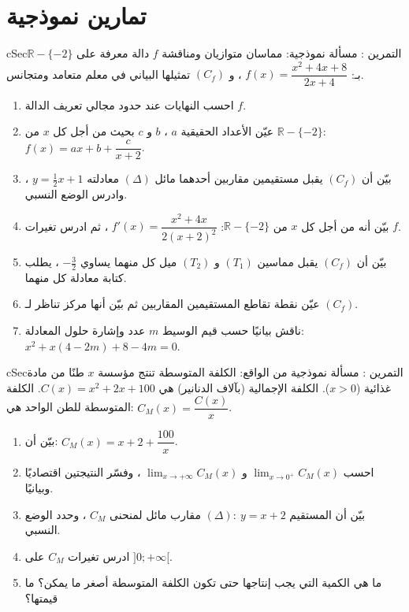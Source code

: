 \documentclass[12pt,a4paper]{article}
\newenvironment{BOX}[2]{\begin{otherlanguage}{english}\begin{arbox}{#1}{#2}}{\end{arbox}\end{otherlanguage}}
\newcounter{exo}
\newenvironment{tamrin}[1]{\stepcounter{exo}\begin{BOX}{cSec}{التمرين \theexo: #1}}{\end{BOX}}
\newcommand{\R}{\mathbb{R}}
\newcommand{\Lm}[1]{\displaystyle\lim_{x\to#1}}
\begin{document}
\section{تمارين نموذجية}
\begin{tamrin}{مسألة نموذجية: مماسان متوازيان ومناقشة}
$f$ دالة معرفة على $\R-\{-2\}$ بـ: $f(x)=\dfrac{x^2+4x+8}{2x+4}$ ، و $(C_f)$ تمثيلها البياني في معلم متعامد ومتجانس.
\begin{enumerate}
\item احسب النهايات عند حدود مجالي تعريف الدالة $f$.
\item عيّن الأعداد الحقيقية $a$ ، $b$ و $c$ بحيث من أجل كل $x$ من $\R-\{-2\}$: $f(x)=ax+b+\dfrac{c}{x+2}$.
\item بيّن أن $(C_f)$ يقبل مستقيمين مقاربين أحدهما مائل $(\Delta)$ معادلته $y=\frac12x+1$ ، وادرس الوضع النسبي.
\item بيّن أنه من أجل كل $x$ من $\R-\{-2\}$: $f'(x)=\dfrac{x^2+4x}{2(x+2)^2}$ ، ثم ادرس تغيرات $f$.
\item بيّن أن $(C_f)$ يقبل مماسين $(T_1)$ و $(T_2)$ ميل كل منهما يساوي $-\frac32$ ، يطلب كتابة معادلة كل منهما.
\item عيّن نقطة تقاطع المستقيمين المقاربين ثم بيّن أنها مركز تناظر لـ $(C_f)$.
\item ناقش بيانيًا حسب قيم الوسيط $m$ عدد وإشارة حلول المعادلة: $x^2+x(4-2m)+8-4m=0$.
\end{enumerate}
\end{tamrin}

\begin{tamrin}{مسألة نموذجية من الواقع: الكلفة المتوسطة}
تنتج مؤسسة $x$ طنًا من مادة غذائية ($x>0$). الكلفة الإجمالية (بآلاف الدنانير) هي $C(x)=x^2+2x+100$. الكلفة المتوسطة للطن الواحد هي: $C_M(x)=\dfrac{C(x)}{x}$.
\begin{enumerate}
\item بيّن أن: $C_M(x)=x+2+\dfrac{100}x$.
\item احسب $\Lm{0^+}C_M(x)$ و $\Lm{+\infty}C_M(x)$ ، وفسّر النتيجتين اقتصاديًا وبيانيًا.
\item بيّن أن المستقيم $(\Delta):\ y=x+2$ مقارب مائل لمنحنى $C_M$ ، وحدد الوضع النسبي.
\item ادرس تغيرات $C_M$ على $]0;+\infty[$.
\item ما هي الكمية التي يجب إنتاجها حتى تكون الكلفة المتوسطة أصغر ما يمكن؟ ما قيمتها؟
\end{enumerate}
\end{tamrin}
\end{document}
